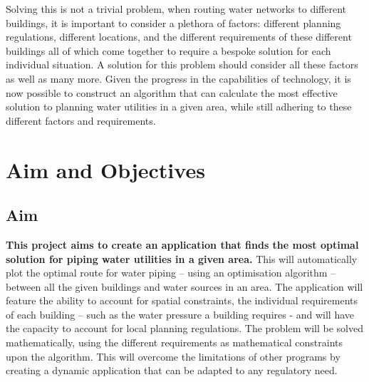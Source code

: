 Solving this is not a trivial problem, when routing water networks to different buildings, it is important to consider a plethora of factors: different planning regulations, different locations, and the different requirements of these different buildings all of which come together to require a bespoke solution for each individual situation. A solution for this problem should consider all these factors as well as many more. Given the progress in the capabilities of technology, it is now possible to construct an algorithm that can calculate the most effective solution to planning water utilities in a given area, while still adhering to these different factors and requirements.

\section{Aim and Objectives}\label{aimsandobjectives}
\subsection{Aim}
\textbf{This project aims to create an application that finds the most optimal solution for piping water utilities in a given area.} This will automatically plot the optimal route for water piping – using an optimisation algorithm – between all the given buildings and water sources in an area. The application will feature the ability to account for spatial constraints, the individual requirements of each building – such as the water pressure a building requires - and will have the capacity to account for local planning regulations. The problem will be solved mathematically, using the different requirements as mathematical constraints upon the algorithm. This will overcome the limitations of other programs by creating a dynamic application that can be adapted to any regulatory need.

